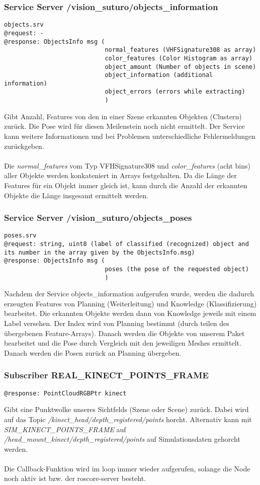 \documentclass{suturo}
\begin{document}
\subsubsection{Service Server /vision\_suturo/objects\_information}
\begin{verbatim}
objects.srv
@request: -
@response: ObjectsInfo msg (
							normal_features (VHFSignature308 as array)
							color_features (Color Histogram as array)
							object_amount (Number of objects in scene)
							object_information (additional information)
							object_errors (errors while extracting)
							)
\end{verbatim}
Gibt Anzahl, Features von den in einer Szene erkannten Objekten (Clustern) zurück. Die Pose wird für diesen Meilenstein noch nicht ermittelt. Der Service kann weitere Informationen und bei Problemen unterschiedliche Fehlermeldungen zurückgeben.
\\ \\
Die \textit{normal\_features} vom Typ VFHSignature308 und \textit{color\_features} (acht bins) aller Objekte werden konkateniert in Arrays festgehalten. 
Da die Länge der Features für ein Objekt immer gleich ist, kann durch die Anzahl der erkannten Objekte die Länge insgesamt ermittelt werden.

\subsubsection{Service Server /vision\_suturo/objects\_poses}
\begin{verbatim}
poses.srv
@request: string, uint8 (label of classified (recognized) object and its number in the array given by the ObjectsInfo.msg)
@response: ObjectsInfo msg (
							poses (the pose of the requested object)
							)
\end{verbatim}
Nachdem der Service objects\_information aufgerufen wurde, werden die dadurch erzeugten Features von Planning (Weiterleitung) und Knowledge (Klassifizierung) bearbeitet. Die erkannten Objekte werden dann von Knowledge jeweils mit einem Label versehen. Der Index wird von Planning bestimmt (durch teilen des übergebenen Feature-Arrays). Danach werden die Objekte von unserem Paket bearbeitet und die Pose durch Vergleich mit den jeweiligen Meshes ermittelt. Danach werden die Posen zurück an Planning übergeben.

\subsubsection{Subscriber REAL\_KINECT\_POINTS\_FRAME}
\begin{verbatim}
@response: PointCloudRGBPtr kinect
\end{verbatim}
Gibt eine Punktwolke unseres Sichtfelds (Szene oder Scene) zurück. Dabei wird auf das Topic \textit{/kinect\_head/depth\_registered/points} horcht. Alternativ kann mit \textit{SIM\_KINECT\_POINTS\_FRAME} auf \textit{/head\_mount\_kinect/depth\_registered/points} auf Simulationsdaten gehorcht werden.
\\ \\
Die Callback-Funktion wird im loop immer wieder aufgerufen, solange die Node noch aktiv ist bzw. der roscore-server besteht.
\end{document}
